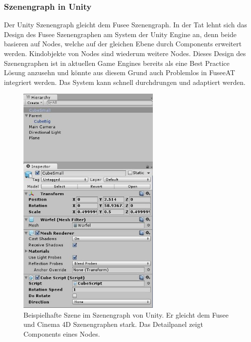 \documentclass[pagesize, paper=a4, fontsize=12pt, titlepage=true, headings=small, headnosepline, abstractoff, liststotoc, nochapterprefix, plainheadsepline, twoside]{scrreprt}
\begin{document}
\subsubsection{Szenengraph in Unity}
Der Unity Szenengraph gleicht dem Fusee Szenengraph. In der Tat lehnt sich das Design des Fusee Szenengraphen am System der Unity Engine an, denn beide basieren auf Nodes, welche auf der gleichen Ebene durch Components erweitert werden. Kindobjekte von Nodes sind wiederum weitere Nodes. Dieses Design des Szenengraphen ist in aktuellen Game Engines bereits als eine Best Practice Lösung anzusehn und könnte aus diesem Grund auch Problemlos in FuseeAT integriert werden. Das System kann schnell durchdrungen und adaptiert werden.
\begin{figure}[ht]
	\centering
	\includegraphics[width=7cm]{Bilder/uSzeneGraphDetails.jpg}
	\caption{Beispielhafte Szene im Szenengraph von Unity. Er gleicht dem Fusee und Cinema 4D Szenengraphen stark. Das Detailpanel zeigt Components eines Nodes.}
	\label{UnitySzenengraph}
\end{figure}
\end{document}
